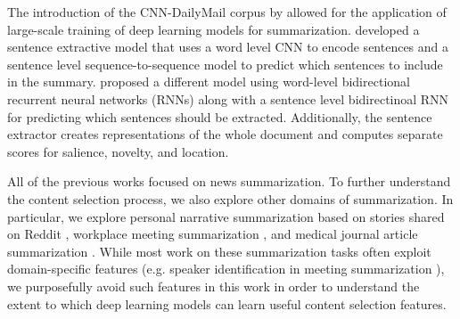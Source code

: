 The introduction of the CNN-DailyMail corpus by \citet{nips15_hermann} 
allowed for the application of large-scale training of deep learning models for summarization.
\citet{cheng2016neural} %
developed a sentence extractive
model that uses a word level 
CNN to encode 
sentences and a sentence level sequence-to-sequence model to predict 
which sentences to include in the summary. \citet{nallapati2017summarunner}
proposed a different model using word-level bidirectional recurrent neural 
networks (RNNs) along with a sentence level bidirectinoal RNN for 
predicting which sentences should be extracted. 
Additionally, the sentence
extractor creates representations of the whole document and computes 
separate scores for salience, novelty, and location.


All of the previous works 
focused on news summarization. To further
understand the content selection process, we also explore other domains 
of summarization. In particular, we explore 
personal narrative summarization based on stories shared
on Reddit \cite{ouyang2017crowd}, workplace meeting summarization
\cite{carletta2005ami}, and medical journal article summarization 
\cite{mishra2014text}. While most work on these summarization tasks
 often exploit domain-specific features (e.g. speaker identification in meeting summarization \cite{gillick2009global}),
we purposefully avoid such features in this work in order to understand 
the extent to which deep learning models can learn useful content 
selection features.


